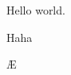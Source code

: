 \documentclass{article}
\begin{document}
Hello \pdfsave{} world.\pdfrestore


Haha


\AE
\end{document}
